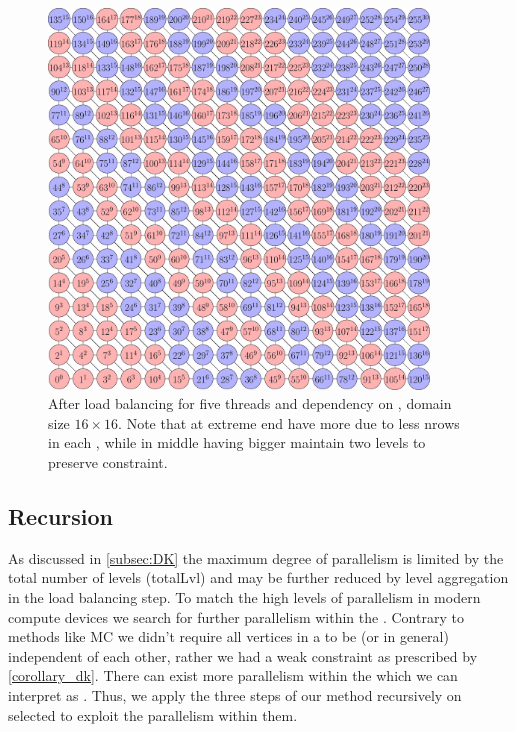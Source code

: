     
    \begin{figure}
      \begin{minipage}[c]{0.63\textwidth}
      	\includegraphics[height=0.26\textheight,width=0.9\textwidth]{pics/load_balancing/2d-7pt/stencil_2d_7pt}
      \end{minipage}\hfill
      \begin{minipage}[c]{0.34\textwidth}
      	\caption{After load balancing for five threads and \DTWO dependency on \stex, domain size $16 \times 16$. Note that \levelGroups at extreme end have more \levels due to less \acrshort{nrows} in each \level, while \levelGroups in middle having bigger \levels maintain two levels to preserve \DTWO constraint.
      	} \label{fig:2d_7pt_lb}
      \end{minipage}
     \end{figure}
     

	\subsection{Recursion}\label{subsec:REC}
As discussed in \cref{subsec:DK} the maximum degree of parallelism is limited by the total number of levels (\acrshort{totalLvl}) and may be further reduced by level aggregation in the load balancing step.  To match the high levels of parallelism in modern compute devices we search for further parallelism within the \levelGroups.  Contrary to methods like \acrfull{MC} we didn't require all vertices in a \levelGroup to be \DONE (or \DK in general) independent of each other, rather we had a weak constraint as prescribed by \cref{corollary_dk}. There can exist more parallelism within the \levelGroups which we can interpret as \subgraphs.  Thus, we apply the three steps of our method recursively on selected \subgraphs to exploit the parallelism within them.  


